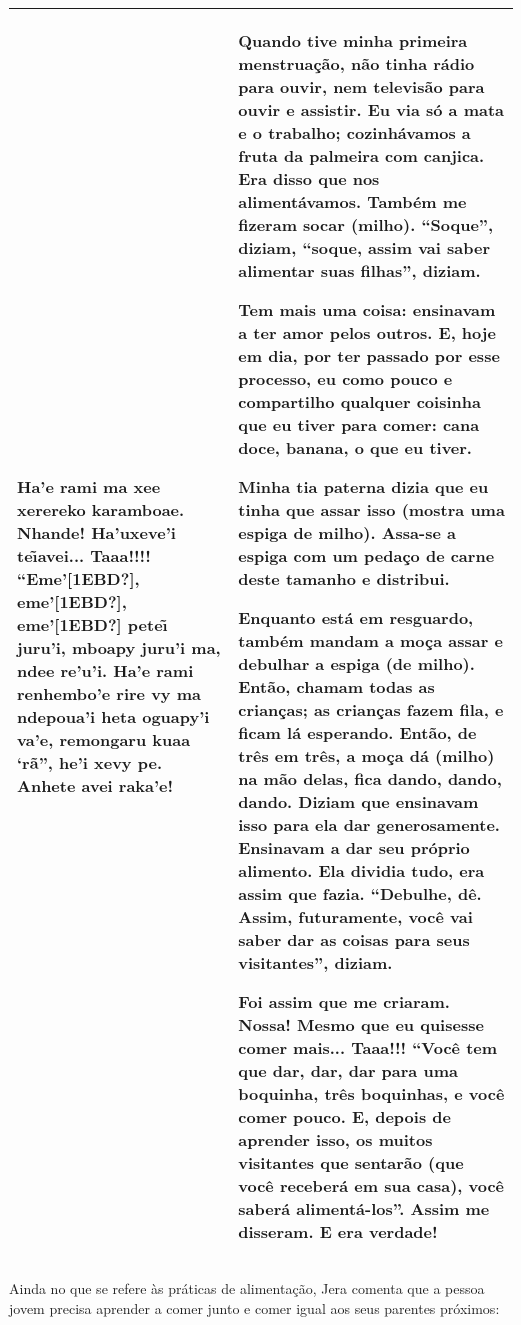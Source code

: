 \documentclass{article}
\begin{document}
\begin{flushleft}
\begin{supertabular}{m{2.8781598in}|m{2.87756in}}
Ha{\textquoteright}e rami ma xee xerereko karamboae. Nhande!
Ha{\textquoteright}uxeve{\textquoteright}i te\~\i avei... Taaa!!!!
{\textquotedblleft}Eme{\textquoteright}[1EBD?],
eme{\textquoteright}[1EBD?], eme{\textquoteright}[1EBD?] pete\~\i
juru{\textquoteright}i, mboapy juru{\textquoteright}i ma, ndee
re{\textquoteright}u{\textquoteright}i. Ha{\textquoteright}e rami
renhembo{\textquoteright}e rire vy ma ndepoua{\textquoteright}i heta
oguapy{\textquoteright}i va{\textquoteright}e, remongaru kuaa
{\textquoteleft}r\~a{\textquotedblright}, he{\textquoteright}i xevy pe.
Anhete avei raka{\textquoteright}e!  &
Quando tive minha primeira menstrua\c{c}\~ao, n\~ao tinha r\'adio para
ouvir, nem televis\~ao para ouvir e assistir. Eu via s\'o a mata e o
trabalho; cozinh\'avamos a fruta da palmeira com canjica. Era disso que
nos aliment\'avamos. Tamb\'em me fizeram socar (milho).
{\textquotedblleft}Soque{\textquotedblright}, diziam,
{\textquotedblleft}soque, assim vai saber alimentar suas
filhas{\textquotedblright}, diziam. 

Tem mais uma coisa: ensinavam a ter amor pelos outros. E, hoje em dia,
por ter passado por esse processo, eu como pouco e compartilho qualquer
coisinha que eu tiver para comer: cana doce, banana, o que eu tiver. 

Minha tia paterna dizia que eu tinha que assar isso (mostra uma espiga
de milho). Assa-se a espiga com um peda\c{c}o de carne deste tamanho e
distribui.

Enquanto est\'a em resguardo, tamb\'em mandam a mo\c{c}a assar e
debulhar a espiga (de milho). Ent\~ao, chamam todas as crian\c{c}as; as
crian\c{c}as fazem fila, e ficam l\'a esperando. Ent\~ao, de tr\^es em
tr\^es, a mo\c{c}a d\'a (milho) na m\~ao delas, fica dando, dando,
dando. Diziam que ensinavam isso para ela dar generosamente. Ensinavam
a dar seu pr\'oprio alimento. Ela dividia tudo, era assim que fazia.
{\textquotedblleft}Debulhe, d\^e. Assim, futuramente, voc\^e vai saber
dar as coisas para seus visitantes{\textquotedblright}, diziam. 

Foi assim que me criaram. Nossa! Mesmo que eu quisesse comer mais...
Taaa!!! {\textquotedblleft}Voc\^e tem que dar, dar, dar para uma
boquinha, tr\^es boquinhas, e voc\^e comer pouco. E, depois de aprender
isso, os muitos visitantes que sentar\~ao (que voc\^e receber\'a em sua
casa), voc\^e saber\'a aliment\'a-los{\textquotedblright}. Assim me
disseram. E era verdade!\\\hline
\end{supertabular}
\end{flushleft}
Ainda no que se refere \`as pr\'aticas de alimenta\c{c}\~ao, Jera
comenta que a pessoa jovem precisa aprender a comer junto e comer igual
aos seus parentes pr\'oximos:
\end{document}
